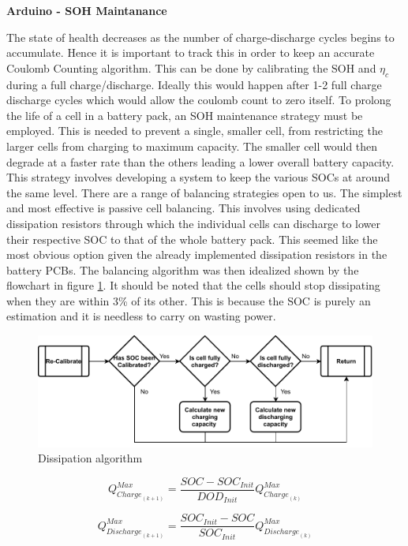 \documentclass[10pt,twoside]{article}
\begin{document}
\textbf{Arduino - SOH Maintanance}

The state of health decreases as the number of charge-discharge cycles begins to accumulate. Hence it is important to track this in order to keep an accurate Coulomb Counting algorithm. This can be done by calibrating the SOH and $\eta_c$ during a full charge/discharge. Ideally this would happen after 1-2 full charge discharge cycles which would allow the coulomb count to zero itself. To prolong the life of a cell in a battery pack, an SOH maintenance strategy must be employed. This is needed to prevent a single, smaller cell, from restricting the larger cells from charging to maximum capacity. The smaller cell would then degrade at a faster rate than the others leading a lower overall battery capacity. This strategy involves developing a system to keep the various SOCs at around the same level. There are a range of balancing strategies open to us. The simplest and most effective is passive cell balancing. This involves using dedicated dissipation resistors through which the individual cells can discharge to lower their respective SOC to that of the whole battery pack. This seemed like the most obvious option given the already implemented dissipation resistors in the battery PCBs. The balancing algorithm was then idealized shown by the flowchart in figure \ref{fig:DisAlgorithm}. It should be noted that the cells should stop dissipating when they are within 3\% of its other. This is because the SOC is purely an estimation and it is needless to carry on wasting power.

\begin{figure}[hbt]
    \centering
    \includegraphics[scale = 0.75]{Recalibration.pdf}
    \caption{Dissipation algorithm}
    \label{fig:DisAlgorithm}
\end{figure}

\noindent\begin{minipage}{.49\linewidth}
\begin{equation}
    Q^{Max}_{{Charge}_{(k+1)}} = \frac{SOC - SOC_{Init}}{DOD_{Init}}Q^{Max}_{{Charge}_{(k)}}
    \label{equ:NewChargingCap}
\end{equation}
\end{minipage}
\begin{minipage}{.49\linewidth}
\begin{equation}
    Q^{Max}_{{Discharge}_{(k+1)}} = \frac{SOC_{Init} - SOC}{SOC_{Init}}Q^{Max}_{{Discharge}_{(k)}}
    \label{equ:NewDischargingCap}
\end{equation}
\end{minipage}
\end{document}
